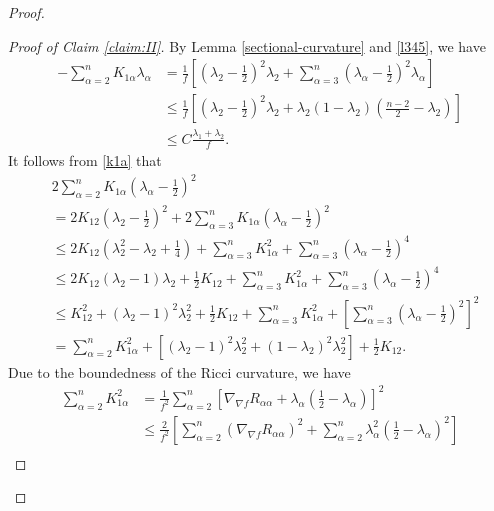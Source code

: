 \documentclass[10pt,a4paper]{amsart}
\begin{document}
\begin{proof}
\begin{proof}[Proof of Claim \ref{claim:II}]
		By Lemma \ref{sectional-curvature} and \eqref{l345}, we have
		\begin{align*}
			-\sum_{\alpha=2}^n K_{1\alpha}\lambda_\alpha &= \frac{1}{f}\left[\left(\lambda_2 - \frac{1}{2}\right)^2\lambda_2 + \sum_{\alpha=3}^n\left(\lambda_\alpha - \frac{1}{2}\right)^2\lambda_\alpha\right] \\
			&\leq \frac{1}{f}\left[\left(\lambda_2 - \frac{1}{2}\right)^2\lambda_2 + \lambda_2(1-\lambda_2)\left(\frac{n-2}{2} - \lambda_2\right)\right] \\
			&\leq C\frac{\lambda_1+\lambda_2}{f}.
		\end{align*}
		It follows from \eqref{k1a} that
		\begin{align*}
			&2\sum_{\alpha=2}^n K_{1\alpha}\left(\lambda_\alpha - \frac{1}{2}\right)^2 \\
			&= 2K_{12}\left(\lambda_2 - \frac{1}{2}\right)^2 + 2\sum_{\alpha=3}^n K_{1\alpha}\left(\lambda_\alpha - \frac{1}{2}\right)^2 \\
			&\leq 2K_{12}\left(\lambda_2^2 - \lambda_2 + \frac{1}{4}\right) + \sum_{\alpha=3}^n K_{1\alpha}^2 + \sum_{\alpha=3}^n \left(\lambda_\alpha - \frac{1}{2}\right)^4 \\
			&\leq 2K_{12}(\lambda_2-1)\lambda_2 + \frac{1}{2}K_{12} + \sum_{\alpha=3}^n K_{1\alpha}^2 + \sum_{\alpha=3}^n \left(\lambda_\alpha - \frac{1}{2}\right)^4 \\
			&\leq K_{12}^2 + (\lambda_2-1)^2\lambda_{2}^2 + \frac{1}{2}K_{12} + \sum_{\alpha=3}^n K_{1\alpha}^2 + \left[\sum_{\alpha=3}^n\left(\lambda_\alpha - \frac{1}{2}\right)^2\right]^2 \\
			&= \sum_{\alpha=2}^n K_{1\alpha}^2 + \left[(\lambda_2-1)^2\lambda_{2}^2 + (1-\lambda_2)^2\lambda_{2}^2\right] + \frac{1}{2}K_{12}.%
		\end{align*}
		Due to the boundedness of the Ricci curvature, we have
		\begin{equation}\label{eq:K1a-square}
		\begin{aligned}
			\sum_{\alpha=2}^n K_{1\alpha}^2 &= \frac{1}{f^2}\sum_{\alpha=2}^n\left[\nabla_{\nabla f}R_{\alpha\alpha} + \lambda_\alpha\left(\frac{1}{2} - \lambda_\alpha\right)\right]^2 \\
			&\leq \frac{2}{f^2}\left[\sum_{\alpha=2}^n\left(\nabla_{\nabla f}R_{\alpha\alpha}\right)^2 + \sum_{\alpha=2}^n\lambda_\alpha^2\left(\frac{1}{2} - \lambda_\alpha\right)^2\right] \\

\end{aligned}
\end{equation}
\end{proof}
\end{proof}
\end{document}

